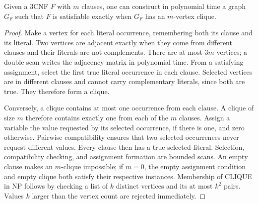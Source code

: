 \begin{theorem}\label{thm:N07}
Given a 3CNF $F$ with $m$ clauses, one can construct in polynomial time a graph
$G_F$ such that $F$ is satisfiable exactly when $G_F$ has an $m$-vertex clique.
\end{theorem}
\begin{proof}
Make a vertex for each literal occurrence, remembering both its clause and its
literal. Two vertices are adjacent exactly when they come from different
clauses and their literals are not complements. There are at most $3m$
vertices; a double scan writes the adjacency matrix in polynomial time.
From a satisfying assignment, select the first true literal occurrence in
each clause. Selected vertices are in different clauses and cannot carry
complementary literals, since both are true. They therefore form a clique.

Conversely, a clique contains at most one occurrence from each clause. A
clique of size $m$ therefore contains exactly one from each of the $m$
clauses. Assign a variable the value requested by its selected occurrence,
if there is one, and zero otherwise. Pairwise compatibility ensures that two
selected occurrences never request different values. Every clause then has
a true selected literal. Selection, compatibility checking, and assignment
formation are bounded scans. An empty clause makes an $m$-clique impossible;
if $m=0$, the empty assignment condition and empty clique both satisfy their
respective instances. Membership of CLIQUE in NP follows by checking a list
of $k$ distinct vertices and its at most $k^2$ pairs. Values $k$ larger than
the vertex count are rejected immediately.
\end{proof}

